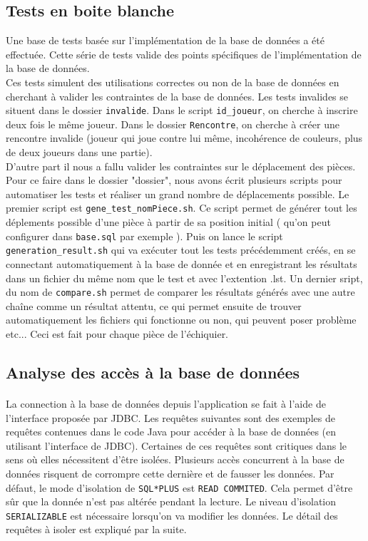 \documentclass[10pt,a4paper]{report}
\begin{document}
\subsection{Tests en boite blanche}
Une base de tests basée sur l'implémentation de la base de données a été effectuée. Cette série de tests valide des points spécifiques de l'implémentation
de la base de données.\\
Ces tests simulent des utilisations correctes ou non de la base de données en cherchant à valider les contraintes de la base de données.
Les tests invalides se situent dans le dossier \lstinline!invalide!. Dans le script \lstinline!id_joueur!, on cherche à inscrire deux fois le
même joueur. Dans le dossier \lstinline!Rencontre!, on cherche à créer une rencontre invalide (joueur qui joue contre lui même, incohérence
de couleurs, plus de deux joueurs dans une partie).\\
D'autre part il nous a fallu valider les contraintes sur le déplacement des pièces.
Pour ce faire dans le dossier "dossier", nous avons écrit plusieurs scripts pour automatiser les tests et réaliser un grand nombre de déplacements 
possible. Le premier script est \lstinline!gene_test_nomPiece.sh!. Ce script permet de générer tout les déplements possible d'une pièce à partir 
de sa position initial ( qu'on peut configurer dans \lstinline!base.sql! par exemple ).
Puis on lance le script \lstinline!generation_result.sh! qui va exécuter tout les tests précédemment créés, en se connectant automatiquement à 
la base de donnée et en enregistrant les résultats dans un fichier du même nom que le test et avec l'extention .lst.
Un dernier sript, du nom de \lstinline!compare.sh! permet de comparer les résultats générés avec une autre chaîne comme un résultat attentu,
ce qui permet ensuite de trouver automatiquement les fichiers qui fonctionne ou non, qui peuvent poser problème etc...
Ceci est fait pour chaque pièce de l'échiquier.

\subsection{Analyse des accès à la base de données}
\paragraph{}
La connection à la base de données depuis l'application se fait à
l'aide de l'interface proposée par JDBC. Les requêtes suivantes sont
des exemples de requêtes contenues dans le code Java pour accéder à la
base de données (en utilisant l'interface de JDBC). Certaines de ces
requêtes sont critiques dans le sens où elles nécessitent d'être
isolées. Plusieurs accès concurrent à la base de données risquent de
corrompre cette dernière et de fausser les données. Par défaut, le
mode d'isolation de \lstinline!SQL*PLUS! est \lstinline!READ
COMMITED!. Cela permet d'être sûr que la donnée n'est pas altérée
pendant la lecture. Le niveau d'isolation \lstinline!SERIALIZABLE! est
nécessaire lorsqu'on va modifier les données. Le détail des
requêtes à isoler est expliqué par la suite.
\end{document}

